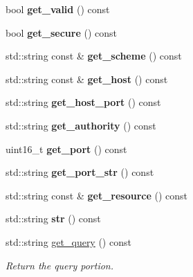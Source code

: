 \begin{DoxyCompactItemize}
\item 
\mbox{\label{classwebsocketpp_1_1uri_a4a3490cc37fe77c74dcc1e2023a94ee8}} 
bool {\bfseries get\+\_\+valid} () const
\item 
\mbox{\label{classwebsocketpp_1_1uri_ac1580a9bc41d2f0258359be018f74e05}} 
bool {\bfseries get\+\_\+secure} () const
\item 
\mbox{\label{classwebsocketpp_1_1uri_a5c429f5ef801b5ac43597e4fd56fb1e5}} 
std\+::string const  \& {\bfseries get\+\_\+scheme} () const
\item 
\mbox{\label{classwebsocketpp_1_1uri_a43ca106f594a4e2a0664c044b56e6463}} 
std\+::string const  \& {\bfseries get\+\_\+host} () const
\item 
\mbox{\label{classwebsocketpp_1_1uri_adf24841d8eef4d7cd8e9687ce23dc5d4}} 
std\+::string {\bfseries get\+\_\+host\+\_\+port} () const
\item 
\mbox{\label{classwebsocketpp_1_1uri_a6d6a43a1f16f50b67316f0ddb5ba638a}} 
std\+::string {\bfseries get\+\_\+authority} () const
\item 
\mbox{\label{classwebsocketpp_1_1uri_a0e076cf37744e52bfc559eaeacba6714}} 
uint16\+\_\+t {\bfseries get\+\_\+port} () const
\item 
\mbox{\label{classwebsocketpp_1_1uri_acd48cd7f186231327bfd9fcfe5f4864f}} 
std\+::string {\bfseries get\+\_\+port\+\_\+str} () const
\item 
\mbox{\label{classwebsocketpp_1_1uri_a58c7782306726d866a1cb8b02e2a5d08}} 
std\+::string const  \& {\bfseries get\+\_\+resource} () const
\item 
\mbox{\label{classwebsocketpp_1_1uri_ad684773687e2b92f2c0d0c9bcad48a17}} 
std\+::string {\bfseries str} () const
\item 
std\+::string \mbox{\hyperlink{classwebsocketpp_1_1uri_a74950872d4c2a4c18df2ec5c9fca1877}{get\+\_\+query}} () const
\begin{DoxyCompactList}\small\item\em Return the query portion. \end{DoxyCompactList}\end{DoxyCompactItemize}


